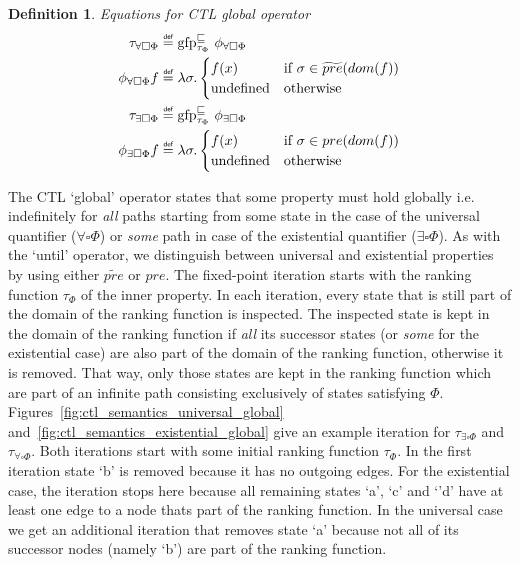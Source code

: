 \documentclass[11pt,a4paper,titlepage]{article}
\newtheorem{definition}{Definition}[section]
\newcommand\eqdef{\mathrel{\overset{\makebox[0pt]{\mbox{\normalfont\tiny\sffamily def}}}{=}}}
\begin{document}
\begin{definition}\label{def:ctl_semantics_global}
    Equations for CTL global operator
    \setlength{\jot}{15pt}
    \begin{align}
        \tau_{\forall\square\Phi} &\eqdef \text{gfp}_{\tau_\Phi}^{\sqsubseteq} \  \phi_{\forall\square\Phi}\\
        \phi_{\forall\square\Phi}f &\eqdef \lambda \sigma.
        \begin{cases}
            f(x)                            & \text{if} \ \sigma \in \widetilde{pre}(dom(f)) \\
            \text{undefined}                & \text{otherwise}
        \end{cases}\\
        \tau_{\exists\square\Phi} &\eqdef \text{gfp}_{\tau_\Phi}^{\sqsubseteq} \  \phi_{\exists\square\Phi}\\
        \phi_{\exists\square\Phi}f &\eqdef \lambda \sigma.
        \begin{cases}
            f(x)                            & \text{if} \ \sigma \in pre(dom(f)) \\
            \text{undefined}                & \text{otherwise}
        \end{cases}
    \end{align}
\end{definition}


The CTL `global' operator states that some property must hold globally i.e. indefinitely for 
\textit{all} paths starting from some state in the case of the universal
quantifier ($\forall\square\Phi$) or \textit{some} path in case of the existential quantifier ($\exists\square\Phi$). 
As with the `until' operator, we distinguish between universal and existential properties by using either $\widetilde{pre}$ or $pre$. 
The fixed-point iteration starts with the ranking function $\tau_\Phi$ of the inner property.
In each iteration, every state that is still part of the domain of the ranking function is inspected. 
The inspected state is kept in the domain of the ranking function if \textit{all} its successor states 
(or \textit{some} for the existential case) are also part of the domain of the ranking function, otherwise it is removed.
That way, only those states are kept in the ranking function which are part of an infinite path consisting exclusively of states satisfying $\Phi$.\\

Figures~\ref{fig:ctl_semantics_universal_global} and~\ref{fig:ctl_semantics_existential_global} give an example iteration for 
$\tau_{\exists\square\Phi}$ and $\tau_{\forall\square\Phi}$. Both iterations start with some initial ranking function $\tau_\Phi$.
In the first iteration state `b' is removed because it has no outgoing edges. For the existential case, the iteration stops here because
all remaining states `a', `c' and `'d' have at least one edge to a node thats part of the ranking function. In the universal case we get an additional
iteration that removes state `a' because not all of its successor nodes (namely `b') are part of the ranking function. 
\end{document}
